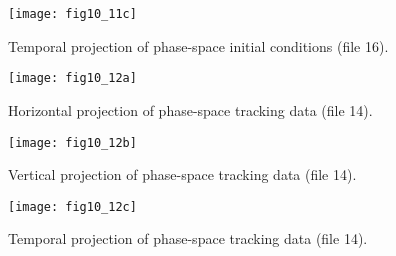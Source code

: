 \newpage
\begin{figure}[htbp]
  \centering
  \texttt{[image: fig10\_11c]}
  \caption{Temporal projection of phase-space initial conditions (file 16).}
\end{figure}

\newpage
\begin{figure}[htbp]
  \centering
  \texttt{[image: fig10\_12a]}
  \caption{Horizontal projection of phase-space tracking data (file 14).}
\end{figure}

\newpage
\begin{figure}[htbp]
  \centering
  \texttt{[image: fig10\_12b]}
  \caption{Vertical projection of phase-space tracking data (file 14).}
\end{figure}

\newpage
\begin{figure}[htbp]
  \centering
  \texttt{[image: fig10\_12c]}
  \caption{Temporal projection of phase-space tracking data (file 14).}
\end{figure}

